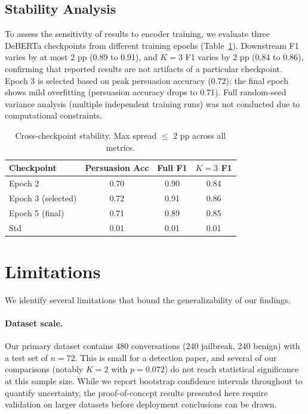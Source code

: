 \documentclass[11pt,a4paper]{article}
\begin{document}
\subsection{Stability Analysis}
\label{sec:stability}

To assess the sensitivity of results to encoder training, we evaluate three DeBERTa checkpoints from different training epochs (Table~\ref{tab:stability}).
Downstream F1 varies by at most 2 pp (0.89 to 0.91), and $K{=}3$ F1 varies by 2 pp (0.84 to 0.86), confirming that reported results are not artifacts of a particular checkpoint.
Epoch 3 is selected based on peak persuasion accuracy (0.72); the final epoch shows mild overfitting (persuasion accuracy drops to 0.71).
Full random-seed variance analysis (multiple independent training runs) was not conducted due to computational constraints.

\begin{table}[t]
\centering
\small
\caption{Cross-checkpoint stability. Max spread $\leq$ 2 pp across all metrics.}
\label{tab:stability}
\begin{tabular}{lccc}
\toprule
\textbf{Checkpoint} & \textbf{Persuasion Acc} & \textbf{Full F1} & \textbf{$K{=}3$ F1} \\
\midrule
Epoch 2 & 0.70 & 0.90 & 0.84 \\
Epoch 3 (selected) & 0.72 & 0.91 & 0.86 \\
Epoch 5 (final) & 0.71 & 0.89 & 0.85 \\
\midrule
Std & 0.01 & 0.01 & 0.01 \\
\bottomrule
\end{tabular}
\end{table}

\section{Limitations}
\label{sec:limitations}

We identify several limitations that bound the generalizability of our findings.

\paragraph{Dataset scale.}
Our primary dataset contains 480 conversations (240 jailbreak, 240 benign) with a test set of $n{=}72$.
This is small for a detection paper, and several of our comparisons (notably $K{=}2$ with $p{=}0.072$) do not reach statistical significance at this sample size.
While we report bootstrap confidence intervals throughout to quantify uncertainty, the proof-of-concept results presented here require validation on larger datasets before deployment conclusions can be drawn.
\end{document}
